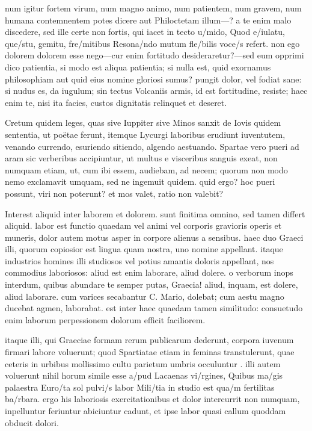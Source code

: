  num igitur fortem virum, num magno animo, num patientem, num gravem, num humana contemnentem potes dicere aut Philoctetam illum—? a te enim malo discedere, sed ille certe non fortis, qui iacet in tecto u/mido, Quod e/iulatu, que/stu, gemitu, fre/mitibus Resona/ndo mutum fle/bilis voce/s refert. non ego dolorem dolorem esse nego—cur enim fortitudo desideraretur?—sed eum opprimi dico patientia, si modo est aliqua patientia; si nulla est, quid exornamus philosophiam aut quid eius nomine gloriosi sumus? pungit dolor, vel fodiat sane: si nudus es, da iugulum; sin tectus Volcaniis armis, id est fortitudine, resiste; haec enim te, nisi ita facies, custos dignitatis relinquet et deseret.

 Cretum quidem leges, quas sive Iuppiter sive Minos sanxit de Iovis quidem sententia, ut poëtae ferunt, itemque Lycurgi laboribus erudiunt iuventutem, venando currendo, esuriendo sitiendo, algendo aestuando. Spartae vero pueri ad aram sic verberibus accipiuntur, ut multus e visceribus sanguis exeat, non numquam etiam, ut, cum ibi essem, audiebam, ad necem; quorum non modo nemo exclamavit umquam, sed ne ingemuit quidem. quid ergo? hoc pueri possunt, viri non poterunt? et mos valet, ratio non valebit?

 Interest aliquid inter laborem et dolorem. sunt finitima omnino, sed tamen differt aliquid. labor est functio quaedam vel animi vel corporis gravioris operis et muneris, dolor autem motus asper in corpore alienus a sensibus. haec duo Graeci illi, quorum copiosior est lingua quam nostra, uno nomine appellant. itaque industrios homines illi studiosos vel potius amantis doloris appellant, nos commodius laboriosos: aliud est enim laborare, aliud dolere. o verborum inops interdum, quibus abundare te semper putas, Graecia! aliud, inquam, est dolere, aliud laborare. cum varices secabantur C. Mario, dolebat; cum aestu magno ducebat agmen, laborabat. est inter haec quaedam tamen similitudo: consuetudo enim laborum perpessionem dolorum efficit faciliorem.

 itaque illi, qui Graeciae formam rerum publicarum dederunt, corpora iuvenum firmari labore voluerunt; quod Spartiatae etiam in feminas transtulerunt, quae ceteris in urbibus mollissimo cultu parietum umbris occuluntur . illi autem voluerunt nihil horum simile esse a/pud Lacaenas vi/rgines, Quibus ma/gis palaestra Euro/ta sol pulvi/s labor Mili/tia in studio est qua/m fertilitas ba/rbara. ergo his laboriosis exercitationibus et dolor intercurrit non numquam, inpelluntur feriuntur abiciuntur cadunt, et ipse labor quasi callum quoddam obducit dolori.

